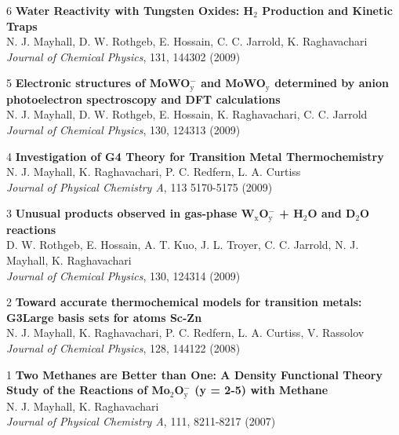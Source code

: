 \documentclass[10pt]{article}
\newenvironment{lonelist}[1][\enskip\textbullet]%
        {\vspace{-\baselineskip}\begin{list}{#1}{%
        \setlength{\partopsep}{0pt}%
        \setlength{\topsep}{0pt}}}
        {\end{list}\vspace{-.6\baselineskip}}
\begin{document}
\begin{lonelist}
\item[6\hspace{4pt}] \textbf{Water Reactivity with Tungsten Oxides: H$_2$ Production and Kinetic Traps}\\
N. J. Mayhall, D. W. Rothgeb, E. Hossain, C. C. Jarrold, K. Raghavachari\\
\textsl{Journal of Chemical Physics}, 131, 144302 (2009)


\item[5\hspace{4pt}] \textbf{Electronic structures of MoWO$_\text{y}^-$ and MoWO$_\text{y}$ determined by anion photoelectron spectroscopy and DFT calculations}\\
N. J. Mayhall, D. W. Rothgeb, E. Hossain, K. Raghavachari, C. C. Jarrold\\
\textsl{Journal of Chemical Physics}, 130, 124313 (2009)


\item[4\hspace{4pt}] \textbf{Investigation of G4 Theory for Transition Metal Thermochemistry}\\
N. J. Mayhall, K. Raghavachari, P. C. Redfern, L. A. Curtiss\\
\textsl{Journal of Physical Chemistry A}, 113 5170-5175 (2009)


\item[3\hspace{4pt}] \textbf{Unusual products observed in gas-phase W$_\text{x}$O$_\text{y}^-$ + H$_2$O and D$_2$O reactions}\\
D. W. Rothgeb, E. Hossain, A. T. Kuo, J. L. Troyer, C. C. Jarrold, N. J. Mayhall, K. Raghavachari\\
\textsl{Journal of Chemical Physics}, 130, 124314 (2009)


\item[2\hspace{4pt}] \textbf{Toward accurate 
thermochemical models for transition metals: G3Large basis sets for atoms Sc-Zn}\\
N. J. Mayhall, K. Raghavachari, P. C. Redfern, L. A. Curtiss, V. Rassolov\\
\textsl{Journal of Chemical Physics}, 128, 144122 (2008)


\item[1\hspace{4pt}] \textbf{Two Methanes are Better than One: A Density Functional Theory Study of the Reactions of Mo$_{2}$O$_\text{y}^-$ (y = 2-5) with Methane}\\
N. J. Mayhall, K. Raghavachari\\
\textsl{Journal of Physical Chemistry A}, 111, 8211-8217 (2007)
\end{lonelist}
\end{document}
